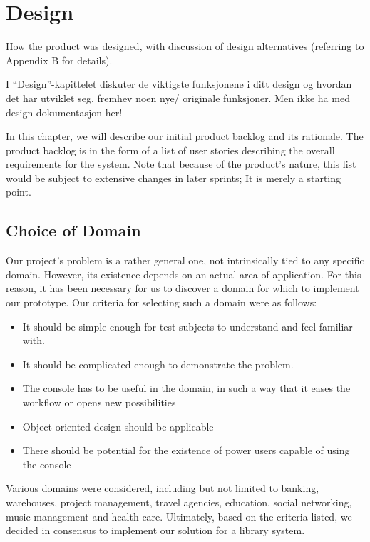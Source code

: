 \chapter{Design}

\minitoc

How the product was designed,   with    discussion  of  design  alternatives
(referring  to  Appendix    B   for details).

I “Design”-kapittelet diskuter de viktigste funksjonene i ditt
design og hvordan det har utviklet seg, fremhev noen nye/
originale funksjoner.
Men ikke ha med design dokumentasjon her!

In this chapter, we will describe our initial product backlog and its rationale. The product backlog is in the form of a list of user stories describing the overall requirements for the system. Note that because of the product's nature, this list would be subject to extensive changes in later sprints; It is merely a starting point.

\clearpage

\section{Choice of Domain}
Our project's problem is a rather general one, not intrinsically tied to any specific domain. However, its existence depends on an actual area of application. For this reason, it has been necessary for us to discover a domain for which to implement our prototype. Our criteria for selecting such a domain were as follows:
\begin{itemize}
\item It should be simple enough for test subjects to understand and feel familiar with.
\item It should be complicated enough to demonstrate the problem.
\item The console has to be useful in the domain, in such a way that it eases the workflow or opens new possibilities
\item Object oriented design should be applicable
\item There should be potential for the existence of power users capable of using the console
\end{itemize}
Various domains were considered, including but not limited to banking, warehouses, project management, travel agencies, education, social networking, music management and health care. Ultimately, based on the criteria listed, we decided in consensus to implement our solution for a library system.

